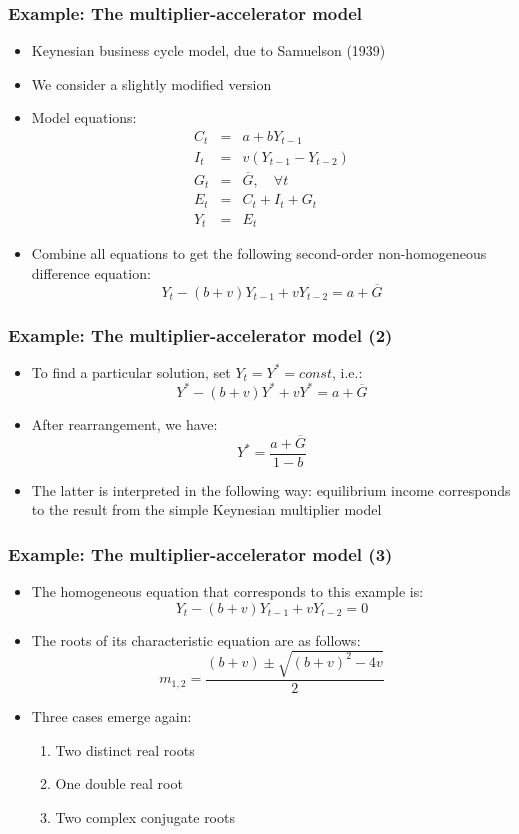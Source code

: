 \documentclass[10pt,usenames,dvipsnames]{beamer}
\theoremstyle{plain}
\theoremstyle{definition}
\begin{document}
\begin{frame}[fragile]
\frametitle{Example: The multiplier-accelerator model}
\begin{itemize}
	\item Keynesian business cycle model, due to Samuelson (1939)
	\item We consider a slightly modified version
	\item Model equations:
	\[
		\begin{array}{lcl}
			C_{t} & = & a + bY_{t-1}\\
			I_{t} & = & v(Y_{t-1} - Y_{t-2})\\
			G_{t} & = & \overline{G}, \quad \forall t\\
			E_{t} & = & C_{t} + I_{t} + G_{t}\\
			Y_{t} & = & E_{t}
		\end{array}
	\]
	\item Combine all equations to get the following second-order non-homogeneous difference equation:
	\[
		Y_{t} - (b + v)Y_{t-1} + vY_{t-2} = a + \overline{G}
	\]
\end{itemize}
\end{frame}

\begin{frame}[fragile]
\frametitle{Example: The multiplier-accelerator model (2)}
\begin{itemize}
	\item To find a particular solution, set $Y_{t} = Y^{*} = const$, i.e.:
	\[
		Y^{*} - (b + v)Y^{*} + vY^{*} = a + \overline{G}
	\]
	\item After rearrangement, we have:
	\[
		Y^{*} = \frac{a + \overline{G}}{1-b}
	\]
	\item The latter is interpreted in the following way: equilibrium income corresponds to the result from the simple Keynesian multiplier model
\end{itemize}
\end{frame}

\begin{frame}[fragile]
\frametitle{Example: The multiplier-accelerator model (3)}
\begin{itemize}
	\item The homogeneous equation that corresponds to this example is:
	\[
		Y_{t} - (b + v)Y_{t-1} + vY_{t-2} = 0
	\]
	\item The roots of its characteristic equation are as follows:
	\[
		m_{1,2} = \frac{(b+v) \pm \sqrt{(b+v)^{2} - 4v}}{2}
	\]
	\item Three cases emerge again:
	\begin{enumerate}
		\item Two distinct real roots
		\item One double real root
		\item Two complex conjugate roots
	\end{enumerate}
\end{itemize}
\end{frame}
\end{document}
